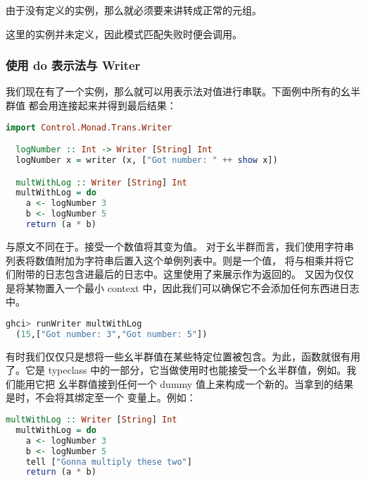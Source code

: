 \documentclass[./main.tex]{subfiles}
\begin{document}
由于没有定义的实例，那么就必须要来讲转成正常的元组。

这里的实例并未定义，因此模式匹配失败时便会调用。

\subsubsection*{使用 do 表示法与 Writer}

我们现在有了一个实例，那么就可以用表示法对值进行串联。下面例中所有的幺半群值
都会用连接起来并得到最后结果：

\begin{lstlisting}[language=Haskell]
  import Control.Monad.Trans.Writer

  logNumber :: Int -> Writer [String] Int
  logNumber x = writer (x, ["Got number: " ++ show x])

  multWithLog :: Writer [String] Int
  multWithLog = do
    a <- logNumber 3
    b <- logNumber 5
    return (a * b)
\end{lstlisting}

与原文不同在于。接受一个数值将其变为值。
对于幺半群而言，我们使用字符串列表将数值附加为字符串后置入这个单例列表中。则是一个值，
将与相乘并将它们附带的日志包含进最后的日志中。这里使用了来展示作为返回的。
又因为仅仅是将某物置入一个最小 context 中，因此我们可以确保它不会添加任何东西进日志中。

\begin{lstlisting}[language=Haskell]
  ghci> runWriter multWithLog
  (15,["Got number: 3","Got number: 5"])
\end{lstlisting}

有时我们仅仅只是想将一些幺半群值在某些特定位置被包含。为此，函数就很有用了。它是
typeclass 中的一部分，它当做使用时也能接受一个幺半群值，例如。我们能用它把
幺半群值接到任何一个 dummy 值\acode{()}上来构成一个新的。当拿到的结果是\acode{()}时，不会将其绑定至一个
变量上。例如：

\begin{lstlisting}[language=Haskell]
  multWithLog :: Writer [String] Int
  multWithLog = do
    a <- logNumber 3
    b <- logNumber 5
    tell ["Gonna multiply these two"]
    return (a * b)
\end{lstlisting}
\end{document}
